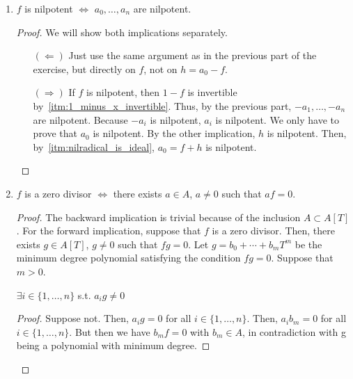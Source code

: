 \begin{problem}
\begin{enumerate}[label=(\theproblem.\arabic*),ref=\theproblem.\arabic*]
        \item $f$ is nilpotent $\iff$ $a_0, \ldots, a_n$ are nilpotent.
            \begin{sol}
                \begin{proof}
                    We will show both implications separately.
                    \begin{itemize}
                        \item[$(\Leftarrow)$]
                        Just use the same argument as in the previous part of the exercise, but directly on $f$, not on $h = a_0-f$.
                        \item[$(\Rightarrow)$]
                        If $f$ is nilpotent, then $1 - f$ is invertible by~\ref{itm:1_minus_x_invertible}.
                        Thus, by the previous part, $-a_1, \ldots, -a_n$ are nilpotent.
                        Because $-a_i$ is nilpotent, $a_i$ is nilpotent.
                        We only have to prove that $a_0$ is nilpotent.
                        By the other implication, $h$ is nilpotent.
                        Then, by~\ref{itm:nilradical_is_ideal}, $a_0 = f + h$ is nilpotent.
                    \end{itemize}
                \end{proof}
            \end{sol}
        \item $f$ is a zero divisor $\iff$ there exists $a \in A$, $a \neq 0$ such that $af = 0$.
            \begin{sol}
                \begin{proof}
                    The backward implication is trivial because of the inclusion $A \subset A[T]$.
                    For the forward implication, suppose that $f$ is a zero divisor.
                    Then, there exists $g \in A[T]$, $g \neq 0$ such that $fg = 0$.
                    Let $g = b_0 + \cdots + b_m T^m$ be the minimum degree polynomial satisfying the condition $fg = 0$.
                    Suppose that $m > 0$.
                    \begin{claim}
                        $\exists i \in \{1, \ldots, n\}$ s.t. $a_i g \neq 0$
                        \begin{proof}
                            Suppose not.
                            Then, $a_i g = 0$ for all $i \in \{1, \dots, n\}$.
                            Then, $a_i b_m = 0$ for all $i \in \{1, \dots, n\}$.
                            But then we have $b_m f = 0$ with $b_m \in A$, in contradiction with g being a polynomial with minimum degree.

\end{proof}
\end{claim}
\end{proof}
\end{sol}
\end{enumerate}
\end{problem}

